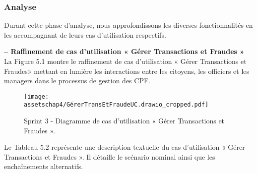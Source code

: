 \subsubsection{Analyse}
Durant cette phase d'analyse, nous approfondissons les diverses fonctionnalités en les accompagnant de leurs cas d'utilisation respectifs.

\textbf{– Raffinement de cas d'utilisation « Gérer Transactions et Fraudes »}\\
La Figure 5.1 montre le raffinement de cas d'utilisation « Gérer Transactions et Fraudes» mettant en lumière les interactions entre les citoyens, les officiers et les managers dans le processus de gestion des CPF.

\begin{figure}[H]
\centering
\texttt{[image: assetschap4/GérerTransEtFraudeUC.drawio\_cropped.pdf]}
\caption{ Sprint 3 - Diagramme de cas d'utilisation « Gérer Transactions et Fraudes ». }
\end{figure}

Le Tableau 5.2 représente une description textuelle du cas d'utilisation « Gérer Transactions et Fraudes ». Il
détaille le scénario nominal ainsi que les enchaînements alternatifs.

